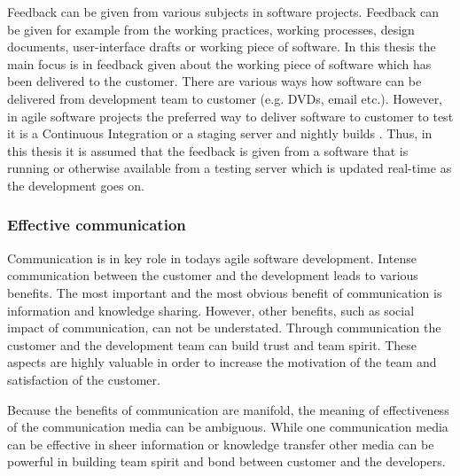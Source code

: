 \documentclass[english,12pt,a4paper,pdftex]{article}
\begin{document}
Feedback can be given from various subjects in software projects. Feedback can be given for example from the working practices, working processes, design documents, user-interface drafts or working piece of software. In this thesis the main focus is in feedback given about the working piece of software which has been delivered to the customer. There are various ways how software can be delivered from development team to customer (e.g. DVDs, email etc.). However, in agile software projects the preferred way to deliver software to customer to test it is a Continuous Integration or a staging server and nightly builds \citep{shore2007} \citep{beck2004}. Thus, in this thesis it is assumed that the feedback is given from a software that is running or otherwise available from a testing server which is updated real-time as the development goes on.

\subsubsection{Effective communication}

Communication is in key role in todays agile software development. Intense communication between the customer and the development leads to various benefits. The most important and the most obvious benefit of communication is information and knowledge sharing. However, other benefits, such as social impact of communication, can not be understated. Through communication the customer and the development team can build trust and team spirit. These aspects are highly valuable in order to increase the motivation of the team and satisfaction of the customer.

Because the benefits of communication are manifold, the meaning of effectiveness of the communication media can be ambiguous. While one communication media can be effective in sheer information or knowledge transfer other media can be powerful in building team spirit and bond between customer and the developers.
\end{document}
